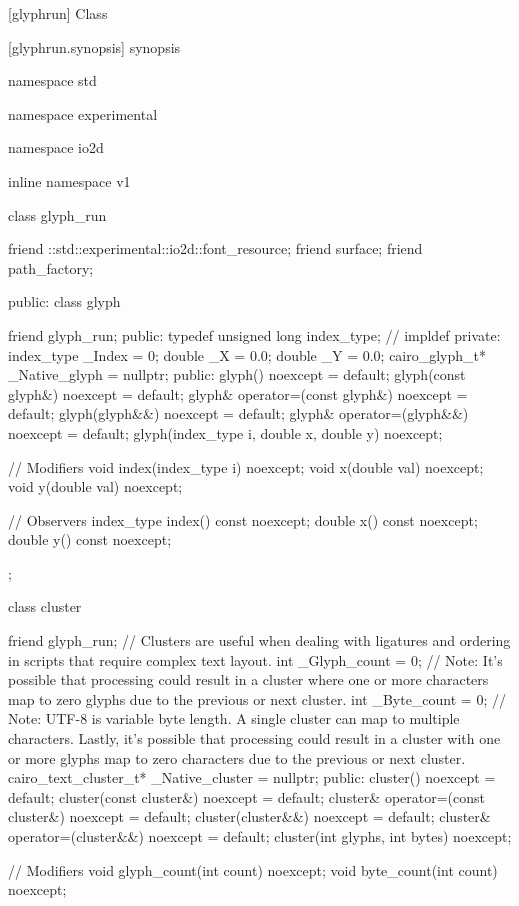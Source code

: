 
 [glyphrun] {Class }

 [glyphrun.synopsis] { synopsis}

\begin{codeblock}
namespace std { namespace experimental { namespace io2d { inline namespace v1 {
  class glyph_run {
    friend ::std::experimental::io2d::font_resource;
    friend surface;
    friend path_factory;

  public:
    class glyph {
      friend glyph_run;
    public:
      typedef unsigned long index_type; // impldef
    private:
      index_type _Index = 0;
      double _X = 0.0;
      double _Y = 0.0;
      cairo_glyph_t* _Native_glyph = nullptr;
    public:
      glyph() noexcept = default;
      glyph(const glyph&) noexcept = default;
      glyph& operator=(const glyph&) noexcept = default;
      glyph(glyph&&) noexcept = default;
      glyph& operator=(glyph&&) noexcept = default;
      glyph(index_type i, double x, double y) noexcept;

      // Modifiers
      void index(index_type i) noexcept;
      void x(double val) noexcept;
      void y(double val) noexcept;

      // Observers
      index_type index() const noexcept;
      double x() const noexcept;
      double y() const noexcept;
    };

    class cluster {
      friend glyph_run;
      // Clusters are useful when dealing with ligatures and ordering in scripts that require complex text layout.
      int _Glyph_count = 0; // Note: It's possible that processing could result in a cluster where one or more characters map to zero glyphs due to the previous or next cluster.
      int _Byte_count = 0; // Note: UTF-8 is variable byte length. A single cluster can map to multiple characters. Lastly, it's possible that processing could result in a cluster with one or more glyphs map to zero characters due to the previous or next cluster.
      cairo_text_cluster_t* _Native_cluster = nullptr;
    public:
      cluster() noexcept = default;
      cluster(const cluster&) noexcept = default;
      cluster& operator=(const cluster&) noexcept = default;
      cluster(cluster&&) noexcept = default;
      cluster& operator=(cluster&&) noexcept = default;
      cluster(int glyphs, int bytes) noexcept;

      // Modifiers
      void glyph_count(int count) noexcept;
      void byte_count(int count) noexcept;

}}}}}}
\end{codeblock}
